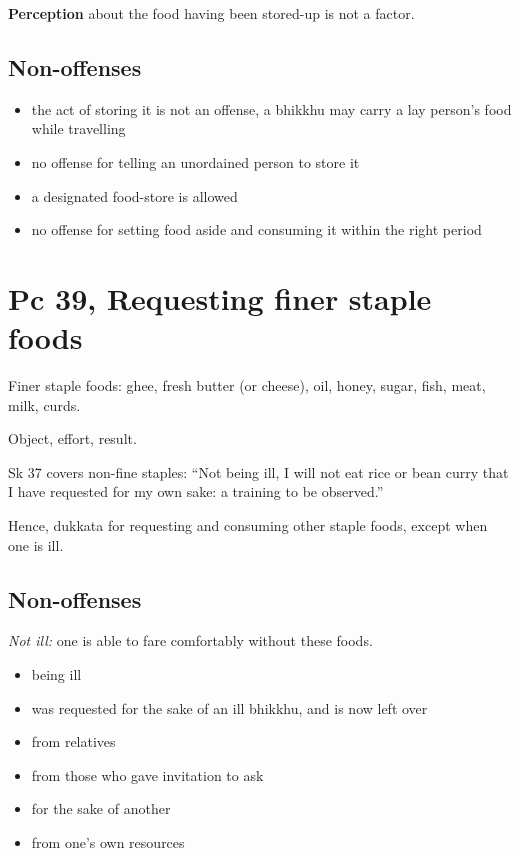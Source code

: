 \textbf{Perception} about the food having been stored-up is not a
factor.

\clearpage

\subsection{Non-offenses}

\begin{itemize}
\tightlist
\item
  the act of storing it is not an offense, a bhikkhu may carry a lay
  person's food while travelling
\item
  no offense for telling an unordained person to store it
\item
  a designated food-store is allowed
\item
  no offense for setting food aside and consuming it within the right
  period
\end{itemize}

\section{Pc 39, Requesting finer staple foods}

Finer staple foods: ghee, fresh butter (or cheese), oil, honey, sugar,
fish, meat, milk, curds.

Object, effort, result.

Sk 37 covers non-fine staples: ``Not being ill, I will not eat rice or
bean curry that I have requested for my own sake: a training to be
observed.''

Hence, dukkata for requesting and consuming other staple foods, except
when one is ill.

\subsection{Non-offenses}

\emph{Not ill:} one is able to fare comfortably without these foods.

\begin{multicols}{2}

\begin{itemize}
\tightlist
\item
  being ill
\item
  was requested for the sake of an ill bhikkhu, and is now left over
\item
  from relatives
\item
  from those who gave invitation to ask
\item
  for the sake of another
\item
  from one's own resources
\end{itemize}

\end{multicols}

